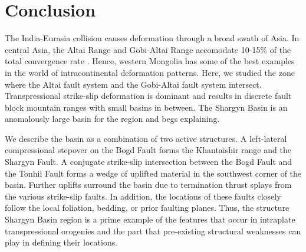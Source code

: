 \section{Conclusion}
	The India-Eurasia collision causes deformation through a broad swath of Asia. In central Asia, the Altai Range and Gobi-Altai Range accomodate 10-15\% of the total convergence rate \citep{Calais2003}. Hence, western Mongolia has some of the best examples in the world of intracontinental deformation patterns. Here, we studied the zone where the Altai fault system and the Gobi-Altai fault system intersect. Transpressional strike-slip deformation is dominant and results in discrete fault block mountain ranges with small basins in between. The Shargyn Basin is an anomalously large basin for the region and begs explaining. 

	We describe the basin as a combination of two active structures. A left-lateral compressional stepover on the Bogd Fault forms the Khantaishir range and the Shargyn Fault. A conjugate strike-slip intersection between the Bogd Fault and the Tonhil Fault forms a wedge of uplifted material in the southwest corner of the basin. Further uplifts surround the basin due to termination thrust splays from the various strike-slip faults. In addition, the locations of these faults closely follow the local foliation, bedding, or prior faulting planes.  Thus, the structure Shargyn Basin region is a prime example of the features that occur in intraplate transpressional orogenies and the part that pre-existing structural weaknesses can play in defining their locations.

